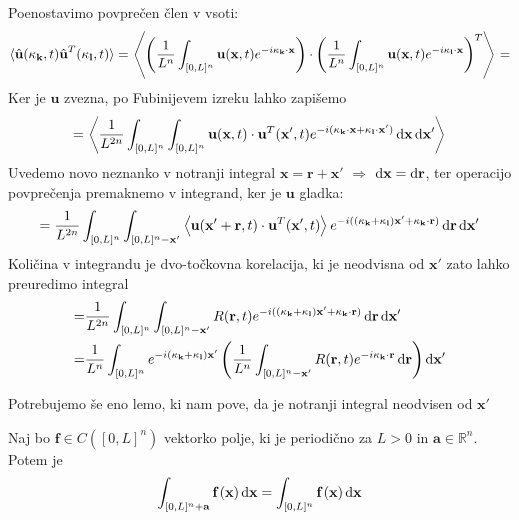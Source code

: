 \documentclass[mat2, tisk]{fmfdelo}
\newcommand{\R}{\mathbb R}
\newcommand{\bd}{\textbf}
\begin{document}
Poenostavimo povprečen člen v vsoti: 
\begin{align*}
  \langle \hat{\bd{u}}(\bd{\text{$\kappa$}}_\bd{k}, t) \hat{\bd{u}}^T(\bd{\text{$\kappa$}}_\bd{l}, t) \rangle = \left\langle \left(\frac{1}{L^n} \int_{[0, L]^n} \bd{u}(\bd{x}, t) e^{-i\bd{\text{$\kappa$}}_{\bd{k}}\cdot \bd{x}} \right) \cdot \left(\frac{1}{L^n} \int_{[0, L]^n} \bd{u}(\bd{x}, t) e^{-i\bd{\text{$\kappa$}}_\bd{l} \cdot \bd{x}} \right)^T \right\rangle = 
\end{align*}
Ker je $\bd{u}$ zvezna, po Fubinijevem izreku lahko zapišemo 
\begin{align*}
= \left\langle \frac{1}{L^{2n}} \int_{[0, L]^{n}} \int_{[0, L]^{n}} \bd{u}(\bd{x}, t) \cdot \bd{u}^T(\bd{x}', t) e^{-i(\bd{\text{$\kappa$}}_{\bd{k}}\cdot \bd{x} + \bd{\text{$\kappa$}}_{\bd{l}}\cdot \bd{x}')} \dif\bd{x} \dif\bd{x}' \right\rangle
\end{align*}
Uvedemo novo neznanko v notranji integral $\bd{x} = \bd{r} + \bd{x}'$ $\Longrightarrow$ $\dif\bd{x} = \dif\bd{r}$, ter operacijo povprečenja premaknemo v integrand, ker 
je $\bd{u}$ gladka:
\begin{align*}
= \frac{1}{L^{2n}} \int_{[0, L]^{n}} \int_{[0, L]^{n} - \bd{x}'} \left\langle\bd{u}(\bd{x}' + \bd{r}, t) \cdot \bd{u}^T(\bd{x}', t)\right\rangle  e^{-i((\bd{\text{$\kappa$}}_{\bd{k}} + \bd{\text{$\kappa$}}_{\bd{l}})\bd{x}' + \bd{\text{$\kappa$}}_{\bd{k}} \cdot \bd{r})} \dif\bd{r} \dif\bd{x}' 
\end{align*}
Količina v integrandu je dvo-točkovna korelacija, ki je neodvisna od $\bd{x}'$
zato lahko preuredimo integral 
\begin{align*}
  =& \frac{1}{L^{2n}} \int_{[0, L]^{n}} \int_{[0, L]^{n} - \bd{x}'} R(\bd{r}, t) e^{-i((\bd{\text{$\kappa$}}_{\bd{k}} + \bd{\text{$\kappa$}}_{\bd{l}})\bd{x}' + \bd{\text{$\kappa$}}_{\bd{k}} \cdot \bd{r})} \dif\bd{r} \dif\bd{x}' \\
  =& \frac{1}{L^{n}} \int_{[0, L]^{n}} e^{-i(\bd{\text{$\kappa$}}_{\bd{k}} + \bd{\text{$\kappa$}}_{\bd{l}})\bd{x}'}\left(\frac{1}{L^n}\int_{[0, L]^{n} - \bd{x}'} R(\bd{r}, t) e^{-i\bd{\text{$\kappa$}}_{\bd{k}} \cdot \bd{r}} \dif\bd{r}\right) \dif\bd{x}'
\end{align*}

Potrebujemo še eno lemo, ki nam pove, da je notranji integral 
neodvisen od $\bd{x}'$

\begin{lema}
Naj bo $\bd{f} \in C([0, L]^n)$ vektorko polje, ki je periodično za 
$L>0$ in $\bd{a}\in \R^n$. Potem je 
\begin{equation*}
\int_{[0, L]^n + \bd{a}}\bd{f}\,(\bd{x}) \dif\bd{x} = \int_{[0, L]^n} \bd{f}\,(\bd{x}) \dif\bd{x}
\end{equation*} 
\end{lema}
\end{document}
